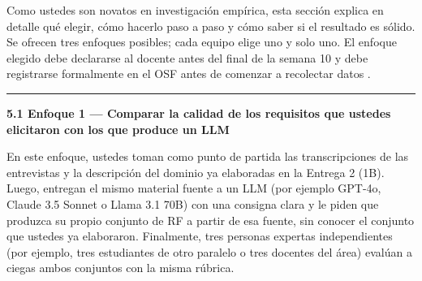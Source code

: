 \documentclass[11pt,a4paper]{article}
\newcounter{secc}
\newcommand{\submark}[1]{\par\vspace{4pt}\noindent
    {\color{uteqgreen}\rule[-1pt]{3.5pt}{12pt}}\hspace{6pt}\textbf{\color{uteqgreen}#1}\par\vspace{2pt}}
\begin{document}
Como ustedes son novatos en investigación empírica, esta sección explica en detalle qué elegir, cómo hacerlo paso a paso y cómo saber si el resultado es sólido.
Se ofrecen tres enfoques posibles; cada equipo elige uno y solo uno.
El enfoque elegido debe declararse al docente antes del final de la semana 10 y debe registrarse formalmente en el OSF antes de comenzar a recolectar datos \cite{nosek2018preregistration}.

\submark{5.1 Enfoque 1 --- Comparar la calidad de los requisitos que ustedes elicitaron con los que produce un LLM}
En este enfoque, ustedes toman como punto de partida las transcripciones de las entrevistas y la descripción del dominio ya elaboradas en la Entrega 2 (1B).
Luego, entregan el mismo material fuente a un LLM (por ejemplo GPT-4o, Claude 3.5 Sonnet o Llama 3.1 70B) con una consigna clara y le piden que produzca su propio conjunto de RF a partir de esa fuente, sin conocer el conjunto que ustedes ya elaboraron.
Finalmente, tres personas expertas independientes (por ejemplo, tres estudiantes de otro paralelo o tres docentes del área) evalúan a ciegas ambos conjuntos con la misma rúbrica.
\end{document}
